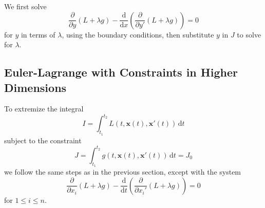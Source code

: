 \documentclass{article}
\theoremstyle{definition}
\theoremstyle{definition}
\theoremstyle{remark}
\begin{document}
We first solve
\begin{equation*}
    \frac{\partial}{\partial y}(L + \lambda g) - \frac{\mathrm{d}}{\mathrm{d}x} \left( \frac{\partial}{\partial y'}(L + \lambda g) \right) = 0
\end{equation*}
for $y$ in terms of $\lambda$, using the boundary conditions, then substitute $y$ in $J$ to solve for $\lambda$.

\subsection{Euler-Lagrange with Constraints in Higher Dimensions}

To extremize the integral
\begin{equation*}
    I = \int_{t_1}^{t_2} L(t, \mathbf{x}(t), \mathbf{x}'(t)) \,\mathrm{d}t
\end{equation*} 
subject to the constraint
\begin{equation*}
    J = \int_{t_1}^{t_2} g(t, \mathbf{x}(t), \mathbf{x}'(t)) \,\mathrm{d}t = J_0
\end{equation*}
we follow the same steps as in the previous section, except with the system
\begin{equation*}
    \frac{\partial}{\partial x_i}(L + \lambda g) - \frac{\mathrm{d}}{\mathrm{d}t} \left( \frac{\partial}{\partial x_i'}(L + \lambda g) \right) = 0
\end{equation*}
for $1 \le i \le n$.
\end{document}
